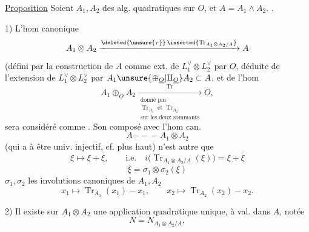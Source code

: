 \uline{Proposition} Soient $A_1,A_2$ des alg. quadratiques sur $O$, et $A=A_1\wedge A_2$. .

1)  L'hom canonique
\[
 A_1\otimes A_2\xrightarrow{\deleted{\unsure{\tau}}\,\inserted{\operatorname{Tr}_{A_1\otimes A_2/A}}}A
\]
(défini par la construction de $A$ comme ext. de $L_1^\vee\otimes L_2^\vee$ par $\underline O$, déduite de l'extension  de $L_1^\vee\otimes L_2^\vee$ par $A_1\unsure{\oplus_{\underline O}|\amalg_{\underline O}}A_2\subset A$,  et de l'hom
\[
 A_1\oplus_{\underline O}A_2\xrightarrow[\substack{\text{donné par}\\ \operatorname{Tr}_{A_1}\text{ et }\operatorname{Tr}_{A_2}\\\text{sur les deux sommants}}]{\operatorname{Tr}}\underline O,
\]
sera considéré comme .
Son composé avec l'hom can.
\[
 A\mathrel{-\!\!-\!\!-}A_1\otimes A_2
\]
(qui a  à être univ. injectif, cf. plus haut)  n'est autre que
\[
 \xi\longmapsto\xi+\bar\xi,\qquad\text{i.e.}\quad
 \boxed{i\bigl(\operatorname{Tr}_{A_1\otimes A_2/A}(\xi)\bigr)=\xi+\bar\xi}
\]
\[
 \bar\xi=\sigma_1\otimes\sigma_2(\xi)
\]
$\sigma_1,\sigma_2$ les involutions canoniques de $A_1,A_2$
\[
 x_1\longmapsto\operatorname{Tr}_{A_1}(x_1)-x_1,\qquad
 x_2\longmapsto\operatorname{Tr}_{A_2}(x_2)-x_2.
\]

2) Il existe sur $A_1\otimes A_2$ une application quadratique unique, à val. dans $A$, notée
\[
 N=N_{A_1\otimes A_2/A},
\]
